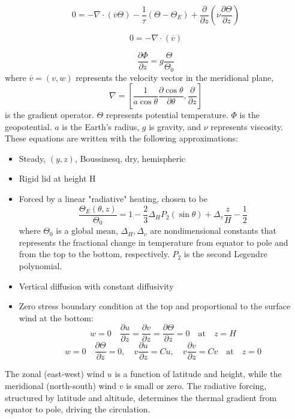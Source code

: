 \[
	0 = -\nabla \cdot ({\overline{v}} {\Theta})
	- \frac{1}{\tau} (\Theta - \Theta_E)
	+ \frac{\partial}{\partial z} \left( \nu \frac{\partial \Theta}{\partial z} \right)
\]

\[
	0 = -\nabla \cdot ({\overline{v}})
\]

\[
	\frac{\partial \Phi}{\partial z} = g \frac{\Theta}{\Theta_0}
\]
where $\overline{v}=(v,w)$ represents the velocity vector in the meridional plane, $$\nabla=\left[\frac{1}{a\cos\theta}\frac{\partial\cos\theta}{\partial\theta}, \frac{\partial}{\partial z}\right]$$ is the gradient operator.
$\Theta$ represents potential temperature.
$\Phi$ is the geopotential.
$a$ is the Earth's radius, $g$ is gravity, and $\nu$ represents viscosity.
These equations are written with the following approximations:
\begin{itemize}
	\item Steady, $(y,z)$, Boussinesq, dry, hemispheric
	\item Rigid lid at height H
	\item Forced by a linear "radiative" heating, chosen to be $$\frac{\Theta_E(\theta,z)}{\Theta_0}=1 - \frac{2}{3} \Delta_H P_2(\sin\theta) + \Delta_v \frac{z}{H} - \frac{1}{2}$$ where $\Theta_0$ is a global mean, $\Delta_H, \Delta_v$ are nondimensional constants that represents the fractional change in temperature from equator to pole and from the
	      top to the bottom, respectively. $P_2$ is the second Legendre polynomial.
	\item Vertical diffusion with constant diffusivity
	\item Zero stress boundary condition at the top and proportional to the surface wind at the bottom:
	      $$w=0\quad\frac{\partial u}{\partial z}=\frac{\partial v}{\partial z}=\frac{\partial\Theta}{\partial z}=0\quad\text{at}\quad z=H$$
	      $$w=0\quad\frac{\partial \Theta}{\partial z}=0,\quad v\frac{\partial u}{\partial z}=Cu,\quad v\frac{\partial v}{\partial z}=Cv\quad\text{at}\quad z=0$$
\end{itemize}

The zonal (east-west) wind $u$ is a function of latitude and height, while the meridional (north-south) wind $v$ is small or zero. The radiative forcing, structured by latitude and altitude, determines the thermal gradient from equator to pole, driving the circulation.


